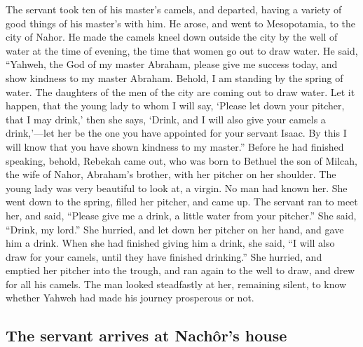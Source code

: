  The servant took ten of his master's camels, and
departed, having a variety of good things of his master's with him. He
arose, and went to Mesopotamia, to the city of Nahor.  He
made the camels kneel down outside the city by the well of water at the
time of evening, the time that women go out to draw water.
 He said, ``Yahweh, the God of my master Abraham, please
give me success today, and show kindness to my master Abraham.
 Behold, I am standing by the spring of water. The
daughters of the men of the city are coming out to draw water.
 Let it happen, that the young lady to whom I will say,
`Please let down your pitcher, that I may drink,' then she says, `Drink,
and I will also give your camels a drink,'---let her be the one you have
appointed for your servant Isaac. By this I will know that you have
shown kindness to my master.''  Before he had finished
speaking, behold, Rebekah came out, who was born to Bethuel the son of
Milcah, the wife of Nahor, Abraham's brother, with her pitcher on her
shoulder.  The young lady was very beautiful to look at,
a virgin. No man had known her. She went down to the spring, filled her
pitcher, and came up.  The servant ran to meet her, and
said, ``Please give me a drink, a little water from your pitcher.''
 She said, ``Drink, my lord.'' She hurried, and let down
her pitcher on her hand, and gave him a drink.  When she
had finished giving him a drink, she said, ``I will also draw for your
camels, until they have finished drinking.''  She
hurried, and emptied her pitcher into the trough, and ran again to the
well to draw, and drew for all his camels.  The man
looked steadfastly at her, remaining silent, to know whether Yahweh had
made his journey prosperous or not.

\hypertarget{the-servant-arrives-at-nachuxf4rs-house}{%
\subsection{The servant arrives at Nachôr's
house}\label{the-servant-arrives-at-nachuxf4rs-house}}

